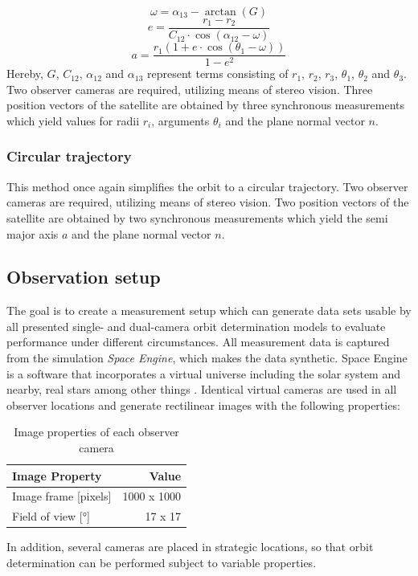 \documentclass[10pt,a4paper]{article}
\begin{document}
	\begin{equation}
		\omega=\alpha_{13}-\arctan(G)
	\end{equation}
	\begin{equation}
		e=\frac{r_1-r_2}{C_{12}\cdot\cos(\alpha_{12}-\omega)}
	\end{equation}
	\begin{equation}
		a=\frac{r_1(1+e\cdot\cos(\theta_1-\omega))}{1-e^2}
	\end{equation}
	\noindent
	Hereby, $G$, $C_{12}$, $\alpha_{12}$ and $\alpha_{13}$ represent terms consisting of $r_1$, $r_2$, $r_3$, $\theta_1$, $\theta_2$ and $\theta_3$.\newline
	Two observer cameras are required, utilizing means of stereo vision. Three position vectors of the satellite are obtained by three synchronous measurements which yield values for radii $r_i$, arguments $\theta_i$ and the plane normal vector $n$. \cite{orbit_determination_preliminary}

	\subsubsection{Circular trajectory}\label{sec:circular_parametric_trajectory}
	This method once again simplifies the orbit to a circular trajectory. Two observer cameras are required, utilizing means of stereo vision. Two position vectors of the satellite are obtained by two synchronous measurements which yield the semi major axis $a$ and the plane normal vector $n$. \cite{orbit_determination_preliminary}
	
	\subsection{Observation setup}\label{sec:observation_setup}
	The goal is to create a measurement setup which can generate data sets usable by all presented single- and dual-camera orbit determination models to evaluate performance under different circumstances. All measurement data is captured from the  simulation \emph{Space Engine}, which makes the data synthetic. Space Engine is a software that incorporates a virtual universe including the solar system and nearby, real stars among other things \cite{space_engine}.\newline
	Identical virtual cameras are used in all observer locations and generate rectilinear images with the following properties:
	\begin{table}[H]
		\centering
		\begin{tabular}{l|r}
			Image Property & Value \\\hline
			Image frame [pixels] & 1000 x 1000 \\
			Field of view [°] & 17 x 17
		\end{tabular}
		\caption{\label{tab:sun_cam}Image properties of each observer camera}
	\end{table}
	\noindent
	In addition, several cameras are placed in strategic locations, so that  orbit determination can be performed subject to variable properties.
\end{document}
